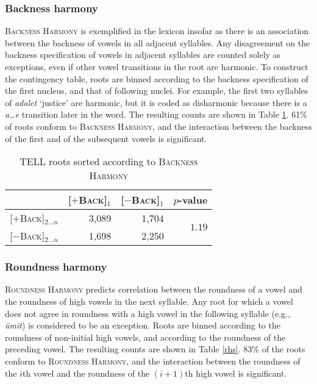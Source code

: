 \subsubsection{Backness harmony}

\textsc{Backness Harmony} is exemplified in the lexicon insofar as there is an association between the backness of vowels in all adjacent syllables. Any disagreement on the backness specification of vowels in adjacent syllables are counted solely as exceptions, even if other vowel transitions in the root are harmonic. 
To construct the contingency table, roots are binned according to the backness specification of the first nucleus, and that of following nuclei. For example, the first two syllables of \emph{adalet} `justice' are harmonic, but it is coded as disharmonic because there is a \emph{a\ldots{}e} transition later in the word. The resulting counts are shown in Table \ref{bhs}. 61\% of roots conform to \textsc{Backness Harmony}, and the interaction between the backness of the first and of the subsequent vowels
is significant.

\begin{table}
\centering
\begin{tabular}{lrrr}
\toprule
                             & [$+$\textsc{Back}]$_1$ & [$-$\textsc{Back}]$_1$ & $p$-value                     \\
\midrule
\buf{}[$+$\textsc{Back}]$_{2\ldots{}n}$ & 3,089                     & 1,704              & \multirow{2}{*}{$1.19$\e{-89}} \\
\buf{}[$-$\textsc{Back}]$_{2\ldots{}n}$ & 1,698                     & 2,250                                               \\
\bottomrule
\end{tabular}
\caption{TELL roots sorted according to \textsc{Backness Harmony}}
\label{bhs}
\end{table}

\subsubsection{Roundness harmony}

\textsc{Roundness Harmony} predicts correlation between the roundness of a vowel and the roundness of high vowels in the next syllable. Any root for which a vowel does not agree in roundness with a high vowel in the following syllable (e.g., \emph{ümit}) is considered to be an exception. Roots are binned according to the roundness of non-initial high vowels, and according to the roundness of the preceding vowel. 
The resulting counts are shown in Table \ref{rhs}. 83\% of the roots conform to \textsc{Roundness Harmony}, and the interaction between the roundness of the $i$th vowel and the roundness of the $(i +1)$th high vowel is significant.


